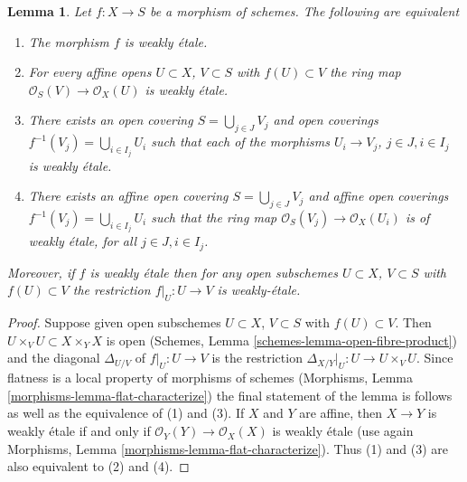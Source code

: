\documentclass[10pt,a4paper]{amsart}
\theoremstyle{plain}
\newtheorem{lemma}[subsection]{Lemma}
\theoremstyle{definition}
\theoremstyle{remark}
\numberwithin{equation}{subsection}
\begin{document}
\begin{lemma}
\label{lemma-weakly-etale-characterize}
Let $f : X \to S$ be a morphism of schemes. The following are equivalent
\begin{enumerate}
\item The morphism $f$ is weakly \'etale.
\item For every affine opens $U \subset X$, $V \subset S$
with $f(U) \subset V$ the ring map
$\mathcal{O}_S(V) \to \mathcal{O}_X(U)$ is weakly \'etale.
\item There exists an open covering $S = \bigcup_{j \in J} V_j$
and open coverings $f^{-1}(V_j) = \bigcup_{i \in I_j} U_i$ such
that each of the morphisms $U_i \to V_j$, $j\in J, i\in I_j$
is weakly \'etale.
\item There exists an affine open covering $S = \bigcup_{j \in J} V_j$
and affine open coverings $f^{-1}(V_j) = \bigcup_{i \in I_j} U_i$ such
that the ring map $\mathcal{O}_S(V_j) \to \mathcal{O}_X(U_i)$ is
of weakly \'etale, for all $j\in J, i\in I_j$.
\end{enumerate}
Moreover, if $f$ is weakly \'etale then for
any open subschemes $U \subset X$, $V \subset S$ with $f(U) \subset V$
the restriction $f|_U : U \to V$ is weakly-\'etale.
\end{lemma}

\begin{proof}
Suppose given open subschemes $U \subset X$, $V \subset S$ with
$f(U) \subset V$. Then $U \times_V U \subset X \times_Y X$ is open
(Schemes, Lemma \ref{schemes-lemma-open-fibre-product})
and the diagonal $\Delta_{U/V}$ of $f|_U : U \to V$ is
the restriction $\Delta_{X/Y}|_U : U \to U \times_V U$.
Since flatness is a local property of morphisms of schemes
(Morphisms, Lemma \ref{morphisms-lemma-flat-characterize})
the final statement of the lemma is follows
as well as the equivalence of (1) and (3).
If $X$ and $Y$ are affine, then $X \to Y$ is weakly \'etale
if and only if $\mathcal{O}_Y(Y) \to \mathcal{O}_X(X)$ is
weakly \'etale (use again
Morphisms, Lemma \ref{morphisms-lemma-flat-characterize}).
Thus (1) and (3) are also equivalent to (2) and (4).
\end{proof}
\end{document}
